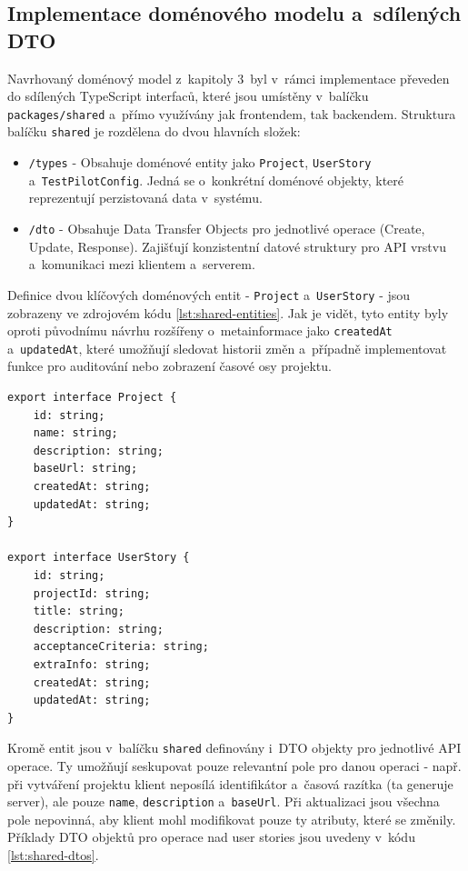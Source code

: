 \documentclass[czech, ing, kiv, he, iso690numb, viewonly]{fasthesis}
\begin{document}
\subsection{Implementace doménového modelu a~sdílených DTO}
Navrhovaný doménový model z~kapitoly 3~byl v~rámci implementace převeden do sdílených TypeScript interfaců, které jsou umístěny v~balíčku \texttt{packages/shared} 
a~přímo využívány jak frontendem, tak backendem. Struktura balíčku \texttt{shared} je rozdělena do dvou hlavních složek:
\begin{itemize}
    \item \texttt{/types} - Obsahuje doménové entity jako \texttt{Project}, \texttt{UserStory} a~\texttt{TestPilotConfig}. 
    Jedná se o~konkrétní doménové objekty, které reprezentují perzistovaná data v~systému.
    \item \texttt{/dto} - Obsahuje Data Transfer Objects pro jednotlivé operace (Create, Update, Response). 
    Zajišťují konzistentní datové struktury pro API vrstvu a~komunikaci mezi klientem a~serverem.
\end{itemize}

Definice dvou klíčových doménových entit - \texttt{Project} a~\texttt{UserStory} - 
jsou zobrazeny ve zdrojovém kódu \ref{lst:shared-entities}. Jak je vidět, tyto entity byly oproti původnímu návrhu 
rozšířeny o~metainformace jako \texttt{createdAt} a~\texttt{updatedAt}, 
které umožňují sledovat historii změn a~případně implementovat funkce pro 
auditování nebo zobrazení časové osy projektu.

\begin{lstlisting}[style=tscode, caption={\protect\centering Ukázka sdílených doménových entit v~balíčku \texttt{@testpilotai/shared}.}, label={lst:shared-entities}, float=false]
export interface Project {
    id: string;
    name: string;
    description: string;
    baseUrl: string;
    createdAt: string;
    updatedAt: string;
}

export interface UserStory {
    id: string;
    projectId: string;
    title: string;
    description: string;
    acceptanceCriteria: string;
    extraInfo: string;
    createdAt: string;
    updatedAt: string;
}
\end{lstlisting}

Kromě entit jsou v~balíčku \texttt{shared} definovány i~DTO objekty pro jednotlivé API operace. 
Ty umožňují seskupovat pouze relevantní pole pro danou operaci - např. při vytváření projektu klient 
neposílá identifikátor a~časová razítka (ta generuje server), ale pouze \texttt{name}, \texttt{description} a~\texttt{baseUrl}. 
Při aktualizaci jsou všechna pole nepovinná, aby klient mohl modifikovat pouze ty atributy, které se změnily.
Příklady DTO objektů pro operace nad user stories jsou uvedeny v~kódu \ref{lst:shared-dtos}.
\end{document}

